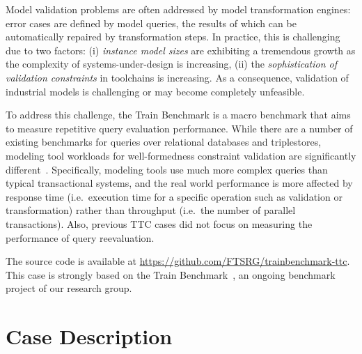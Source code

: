 \documentclass[submission,copyright,creativecommons]{eptcs}
\newcommand{\tb}{Train Benchmark\xspace}
\begin{document}
Model validation problems are often addressed by model transformation engines: error cases are defined by model queries, the results of which can be automatically repaired by transformation steps. In practice, this is challenging due to two factors: (i) \emph{instance model sizes} are exhibiting a tremendous growth as the complexity of systems-under-design is increasing, (ii) the \emph{sophistication of validation constraints} in toolchains is increasing. As a consequence, validation of industrial models is challenging or may become completely unfeasible.

To address this challenge, the \tb is a macro benchmark that aims to measure repetitive query evaluation performance. While there are a number of existing benchmarks for queries over relational databases%
and triplestores, %
modeling tool workloads for well-formedness constraint validation are significantly different~\cite{ase2013}. Specifically, modeling tools use much more complex queries than typical transactional systems, and the real world performance is more affected by response time (i.e.\ execution time for a specific operation such as validation or transformation) rather than throughput (i.e.\ the number of parallel transactions). Also, previous TTC cases did not focus on measuring the performance of query reevaluation.


The source code is available at \url{https://github.com/FTSRG/trainbenchmark-ttc}. This case is strongly based on the \tb~\cite{TrainBenchmarkTechReport}, an ongoing benchmark project of our research group. %

\section{Case Description}
\end{document}
